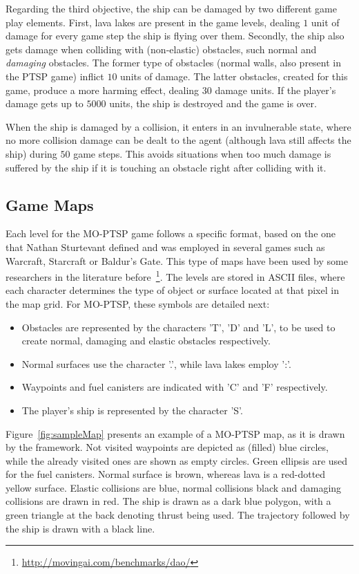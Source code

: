 \documentclass[conference]{IEEEtran}
\begin{document}
Regarding the third objective, the ship can be damaged by two different game play elements. First, lava lakes are present in the game levels, dealing $1$ unit of damage for every game step the ship is flying over them. Secondly, the ship also gets damage when colliding with (non-elastic) obstacles, such normal and \textit{damaging} obstacles. The former type of obstacles (normal walls, also present in the PTSP game) inflict $10$ units of damage. The latter obstacles, created for this game, produce a more harming effect, dealing $30$ damage units. If the player's damage gets up to $5000$ units, the ship is destroyed and the game is over.

When the ship is damaged by a collision, it enters in an invulnerable state, where no more collision damage can be dealt to the agent (although lava still affects the ship) during $50$ game steps. This avoids situations when too much damage is suffered by the ship if it is touching an obstacle right after colliding with it.

\subsection{Game Maps}

Each level for the MO-PTSP game follows a specific format, based on the one that Nathan Sturtevant defined and was employed in several games such as Warcraft, Starcraft or Baldur's Gate. This type of maps have been used by some researchers in the literature before~\footnote{\url{http://movingai.com/benchmarks/dao/}}. The levels are stored in ASCII files, where each character determines the type of object or surface located at that pixel in the map grid. For MO-PTSP, these symbols are detailed next:

\begin{itemize}
\item Obstacles are represented by the characters 'T', 'D' and 'L', to be used to create normal, damaging and elastic obstacles respectively.
\item Normal surfaces use the character '.', while lava lakes employ ':'.
\item Waypoints and fuel canisters are indicated with 'C' and 'F' respectively.
\item The player's ship is represented by the character 'S'.
\end{itemize}

Figure~\ref{fig:sampleMap} presents an example of a MO-PTSP map, as it is drawn by the framework. Not visited waypoints are depicted as (filled) blue circles, while the already visited ones are shown as empty circles. Green ellipsis are used for the fuel canisters. Normal surface is brown, whereas lava is a red-dotted yellow surface. Elastic collisions are blue, normal collisions black and damaging collisions are drawn in red. The ship is drawn as a dark blue polygon, with a green triangle at the back denoting thrust being used. The trajectory followed by the ship is drawn with a black line.
\end{document}
